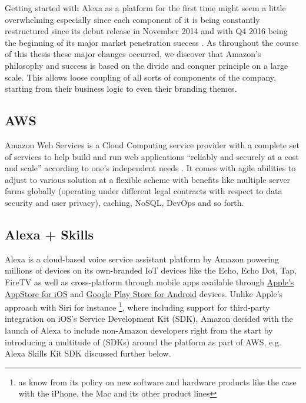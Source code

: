 Getting started with Alexa as a platform for the first time might seem a little overwhelming especially since each component of it is being  constantly restructured since its debut release in November 2014 and with Q4 2016 being the beginning of its major market penetration success \cite{gartnerpreds17}. %
As throughout the course of this thesis these major changes occurred, we discover that Amazon's philosophy and success is based on the divide and conquer principle on  a large scale. This allows loose coupling of all sorts of components of the company, starting from their business logic to even their branding themes. %
 

\subsection*{AWS}
Amazon Web Services is a Cloud Computing service provider with a complete set of services to help build and run web applications ``reliably and securely at a cost and scale'' according to one's independent needs \cite{aws_website}.
It comes with agile abilities to adjust to various solution at a flexible scheme with benefits like multiple server farms globally (operating under different legal contracts with respect to data security and user privacy), caching, NoSQL, DevOps and so forth.


\subsection*{Alexa + Skills}
\label{alexa:def}
Alexa is a cloud-based voice service assistant platform by Amazon powering millions of devices %
on its own-branded IoT devices like the Echo, Echo Dot, Tap, FireTV as well as cross-platform through mobile apps available through  \href{https://itunes.apple.com/de/app/amazon-alexa/id944011620?l=en&mt=8}{Apple's AppStore for iOS} and  \href{https://play.google.com/store/apps/details?id=com.amazon.dee.app&hl=en}{Google Play Store for Android} devices. Unlike Apple's approach with Siri for instance \footnote{as know from its policy on  new software and hardware products like the case with the iPhone, the Mac and its other product lines}, where including support for third-party integration on iOS's Service Development Kit (SDK), Amazon decided with the launch of Alexa to include non-Amazon developers right from the start by introducing a multitude of (SDKs) around the platform as part of AWS, e.g. Alexa Skills Kit SDK discussed further below.

